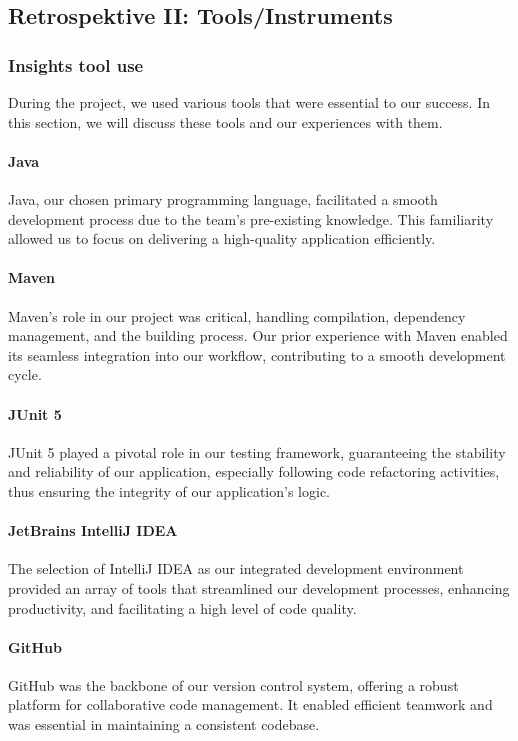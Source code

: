 \subsection{Retrospektive II: Tools/Instruments}

\subsubsection{Insights tool use}
During the project, we used various tools that were essential to our success.
In this section, we will discuss these tools and our experiences with them.

\paragraph{Java}
Java, our chosen primary programming language, facilitated a smooth development process due to the team's pre-existing knowledge.
This familiarity allowed us to focus on delivering a high-quality application efficiently.

\paragraph{Maven}
Maven's role in our project was critical, handling compilation, dependency management, and the building process.
Our prior experience with Maven enabled its seamless integration into our workflow, contributing to a smooth development cycle.

\paragraph{JUnit 5}
JUnit 5 played a pivotal role in our testing framework, guaranteeing the stability and reliability of our application, especially following code refactoring activities, thus ensuring the integrity of our application's logic.

\paragraph{JetBrains IntelliJ IDEA}
The selection of IntelliJ IDEA as our integrated development environment provided an array of tools that streamlined our development processes, enhancing productivity, and facilitating a high level of code quality.

\paragraph{GitHub}
GitHub was the backbone of our version control system, offering a robust platform for collaborative code management.
It enabled efficient teamwork and was essential in maintaining a consistent codebase.

